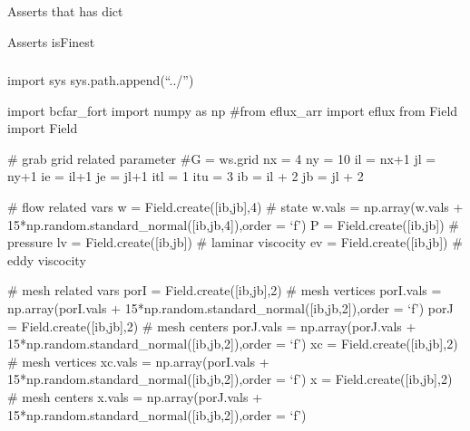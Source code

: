 \documentclass[letterpaper,10pt,english]{sphinxmanual}
\begin{document}
\begin{fulllineitems}
\label{\detokenize{autoapi/tests/test_Workspace/index:tests.test_Workspace.test_has_dict}}
\sphinxAtStartPar
Asserts that has dict

\end{fulllineitems}


\begin{fulllineitems}
\label{\detokenize{autoapi/tests/test_Workspace/index:tests.test_Workspace.test_finest}}
\sphinxAtStartPar
Asserts isFinest

\end{fulllineitems}



\subsubsection{}
\label{\detokenize{autoapi/tests/test_bcfar/index:module-tests.test_bcfar}}\label{\detokenize{autoapi/tests/test_bcfar/index:tests-test-bcfar}}\label{\detokenize{autoapi/tests/test_bcfar/index::doc}}
\sphinxAtStartPar
import sys
sys.path.append(“../”)

\sphinxAtStartPar
import bcfar\_fort
import numpy as np
\#from eflux\_arr import eflux
from Field import Field

\sphinxAtStartPar
\# grab grid related parameter
\#G = ws.grid
nx = 4
ny = 10
il = nx+1
jl = ny+1
ie = il+1
je = jl+1
itl = 1
itu = 3
ib = il + 2
jb = jl + 2

\sphinxAtStartPar
\# flow related vars
w = Field.create({[}ib,jb{]},4) \# state
w.vals = np.array(w.vals + 15*np.random.standard\_normal({[}ib,jb,4{]}),order = ‘f’)
P = Field.create({[}ib,jb{]}) \# pressure
lv = Field.create({[}ib,jb{]}) \# laminar viscocity
ev = Field.create({[}ib,jb{]}) \# eddy viscocity

\sphinxAtStartPar
\# mesh related vars
porI = Field.create({[}ib,jb{]},2) \# mesh vertices
porI.vals = np.array(porI.vals + 15*np.random.standard\_normal({[}ib,jb,2{]}),order = ‘f’)
porJ = Field.create({[}ib,jb{]},2) \# mesh centers
porJ.vals = np.array(porJ.vals + 15*np.random.standard\_normal({[}ib,jb,2{]}),order = ‘f’)
xc = Field.create({[}ib,jb{]},2) \# mesh vertices
xc.vals = np.array(porI.vals + 15*np.random.standard\_normal({[}ib,jb,2{]}),order = ‘f’)
x = Field.create({[}ib,jb{]},2) \# mesh centers
x.vals = np.array(porJ.vals + 15*np.random.standard\_normal({[}ib,jb,2{]}),order = ‘f’)
\end{document}
